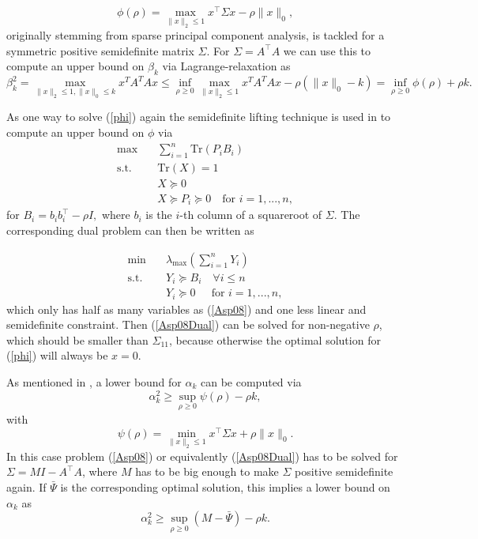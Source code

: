 \documentclass[a4paper,11pt,1p]{elsarticle}
\newcommand{\Norm}[2]{\lVert{#1}\rVert_{#2}}
\newcommand{\T}{^{\top}}
\newcommand{\Tr}{\text{Tr}}
\begin{document}
\begin{equation}\label{phi}
 \phi(\rho) = \max_{\Norm{x}{2} \leq 1} x\T \Sigma x - \rho \Norm{x}{0},
\end{equation}
originally stemming from sparse principal component analysis, is tackled for a symmetric positive semidefinite matrix $\Sigma$. For
$\Sigma = A\T A$ we can use this to compute an upper bound on $\beta_k$ via Lagrange-relaxation as
\begin{equation*}
\beta_k^2 = \max_{\|x\|_2 \leq 1, \|x\|_0 \leq k} x^TA^TAx \leq \inf_{\rho \geq 0} \max_{\|x\|_2\leq 1} x^TA^TAx - \rho (\|x\|_0-k) = \inf_{\rho \geq 0} \phi(\rho) + \rho k.
\end{equation*}

As one way to solve (\ref{phi}) again the semidefinite lifting technique is used in \cite{Asp08} to compute an upper bound on $\phi$ via
\begin{align}\label{Asp08}
 \max \quad & \sum_{i=1}^n\Tr(P_iB_i) \nonumber \\
 \text{s.t.} \quad & \Tr(X) = 1 \nonumber \\
 & X \succeq 0 \tag{A2-Primal} \\
 & X \succeq P_i \succeq 0 \quad \text{for } i = 1, ..., n, \nonumber
\end{align}
for $B_i = b_ib_i\T - \rho I,$ where $b_i$ is the $i$-th column of a squareroot of $\Sigma$. The corresponding dual problem can then be written as 

\begin{align}\label{Asp08Dual}
  \min \quad & \lambda_{\max}\left(\sum_{i=1}^n Y_i \right) \nonumber \\
  \text{s.t.} \quad & Y_i \succeq B_i \quad \forall i \leq n \tag{A2-Dual} \\
  & Y_i \succeq 0 \quad \ \ \text{for } i = 1, ..., n, \nonumber
\end{align}
which only has half as many variables as (\ref{Asp08}) and one less linear and semidefinite constraint. Then (\ref{Asp08Dual}) can be solved for non-negative $\rho$, which should be smaller than $\Sigma_{11}$, because otherwise the
optimal solution for (\ref{phi}) will always be $x=0$. 

As mentioned in \cite{Asp08}, a lower bound for $\alpha_k$ can be computed via
\begin{equation*}
 \alpha_k^2 \geq \sup_{\rho \geq 0} \psi(\rho) - \rho k,
\end{equation*}
with 
\begin{equation*}
 \psi(\rho) = \min_{\Norm{x}{2} \leq 1} x\T \Sigma x + \rho \Norm{x}{0}.
\end{equation*}
In this case problem (\ref{Asp08}) or equivalently (\ref{Asp08Dual}) has to be solved for $\Sigma = M I - A\T A$, where $M$ has to be big enough to make $\Sigma$ positive semidefinite again. If $\bar{\Psi}$ is the corresponding optimal solution, this implies
a lower bound on $\alpha_k$ as
\begin{equation*}
 \alpha_k^2 \geq \sup_{\rho \geq 0} (M - \bar{\Psi}) - \rho k.
\end{equation*}
\end{document}
